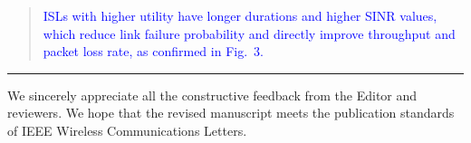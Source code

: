 \documentclass[letter]{article}
\begin{document}
\begin{quote}
\textcolor{blue}{ISLs with higher utility have longer durations and higher SINR values, which reduce link failure probability and directly improve throughput and packet loss rate, as confirmed in Fig.~3.}
\end{quote}

\vspace{1cm}
\noindent\rule{\textwidth}{0.5mm}

\noindent We sincerely appreciate all the constructive feedback from the Editor and reviewers. We hope that the revised manuscript meets the publication standards of IEEE Wireless Communications Letters.



\end{document}
